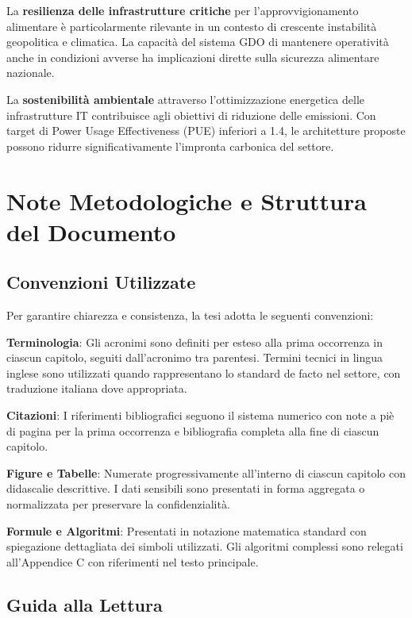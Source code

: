 La \textbf{resilienza delle infrastrutture critiche} per l'approvvigionamento alimentare è particolarmente rilevante in un contesto di crescente instabilità geopolitica e climatica. La capacità del sistema GDO di mantenere operatività anche in condizioni avverse ha implicazioni dirette sulla sicurezza alimentare nazionale.

La \textbf{sostenibilità ambientale} attraverso l'ottimizzazione energetica delle infrastrutture IT contribuisce agli obiettivi di riduzione delle emissioni. Con target di Power Usage Effectiveness (PUE) inferiori a 1.4, le architetture proposte possono ridurre significativamente l'impronta carbonica del settore.

\section{Note Metodologiche e Struttura del Documento}

\subsection{Convenzioni Utilizzate}

Per garantire chiarezza e consistenza, la tesi adotta le seguenti convenzioni:

\textbf{Terminologia}: Gli acronimi sono definiti per esteso alla prima occorrenza in ciascun capitolo, seguiti dall'acronimo tra parentesi. Termini tecnici in lingua inglese sono utilizzati quando rappresentano lo standard de facto nel settore, con traduzione italiana dove appropriata.

\textbf{Citazioni}: I riferimenti bibliografici seguono il sistema numerico con note a piè di pagina per la prima occorrenza e bibliografia completa alla fine di ciascun capitolo.

\textbf{Figure e Tabelle}: Numerate progressivamente all'interno di ciascun capitolo con didascalie descrittive. I dati sensibili sono presentati in forma aggregata o normalizzata per preservare la confidenzialità.

\textbf{Formule e Algoritmi}: Presentati in notazione matematica standard con spiegazione dettagliata dei simboli utilizzati. Gli algoritmi complessi sono relegati all'Appendice C con riferimenti nel testo principale.

\subsection{Guida alla Lettura}

